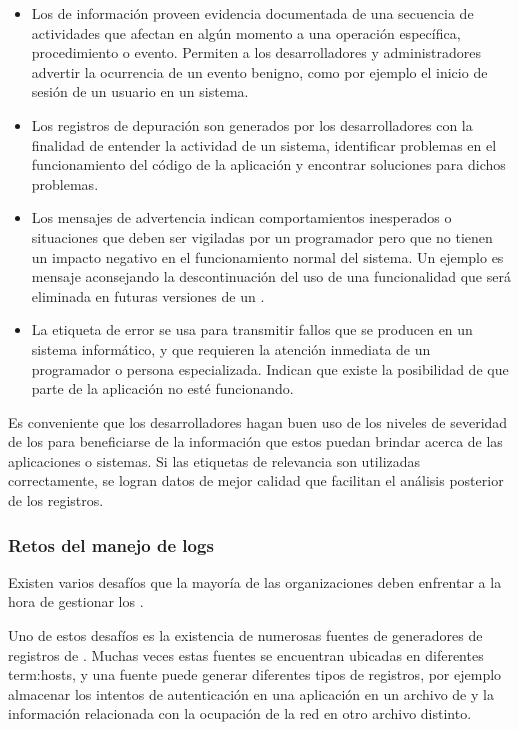 \begin{itemize}
  \item Los  de información proveen evidencia documentada de una
    secuencia de actividades que afectan en algún momento a una operación
    específica, procedimiento o evento. Permiten a los desarrolladores y
    administradores advertir la ocurrencia de un evento benigno, como por
    ejemplo el inicio de sesión de un usuario en un sistema.

  \item Los registros de depuración son generados por los desarrolladores con
    la finalidad de entender la actividad de un sistema, identificar problemas
    en el funcionamiento del código de la aplicación y encontrar soluciones
    para dichos problemas.

  \item Los mensajes de advertencia indican comportamientos inesperados o
    situaciones que deben ser vigiladas por un programador pero que no tienen
    un impacto negativo en el funcionamiento normal del sistema. Un ejemplo es
    mensaje aconsejando la descontinuación del uso de una funcionalidad que
    será eliminada en futuras versiones de un .

  \item La etiqueta de error se usa para transmitir fallos que se producen en
    un sistema informático, y que requieren la atención inmediata de un
    programador o persona especializada. Indican que existe la posibilidad de
    que parte de la aplicación no esté 
    funcionando\cite[p.~3]{monitoreo:logging_and_log_management}.
\end{itemize}

Es conveniente que los desarrolladores hagan buen uso de los niveles de
severidad de los  para beneficiarse de la información que estos puedan
brindar acerca de las aplicaciones o sistemas. Si las etiquetas de relevancia
son utilizadas correctamente, se logran datos de mejor calidad que facilitan el
análisis posterior de los registros.

\subsubsection*{Retos del manejo de logs}
\label{retos_del_manejo_de_logs}

Existen varios desafíos que la mayoría de las organizaciones deben enfrentar a
la hora de gestionar los .

Uno de estos desafíos es la existencia de numerosas fuentes de 
generadores de registros de . Muchas veces estas fuentes se encuentran
ubicadas en diferentes \glspl{term:host}, y una fuente puede generar diferentes
tipos de registros, por ejemplo almacenar los intentos de autenticación en una
aplicación en un archivo de  y la información relacionada con la
ocupación de la red en otro archivo distinto.


